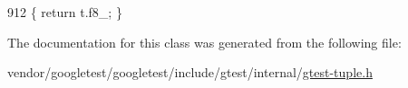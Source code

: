 \begin{DoxyCode}
912                              \{ \textcolor{keywordflow}{return} t.f8\_; \}
\end{DoxyCode}


The documentation for this class was generated from the following file\+:\begin{DoxyCompactItemize}
\item 
vendor/googletest/googletest/include/gtest/internal/\hyperlink{gtest-tuple_8h}{gtest-\/tuple.\+h}\end{DoxyCompactItemize}
